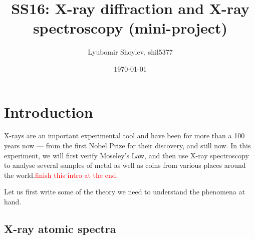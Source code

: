 \documentclass[11pt,a4paper,twoside,onecolumn]{article}
\title{\textbf{SS16: X-ray diffraction and X-ray spectroscopy (mini-project)}}
\author{Lyubomir Shoylev, shil5377}
\date{\today}
\newcommand{\reminder}[1]{\textcolor{red}{#1}}
\begin{document}
\maketitle

\begin{abstract}
    \lipsum
\end{abstract}

\section{Introduction}

X-rays are an important experimental tool and have been for more than a 100 years now --- from the first Nobel Prize for their discovery, and still now. In this experiment, we will first verify Moseley's Law, and then use X-ray spectroscopy to analyse several samples of metal as well as coins from various places around the world.\reminder{finish this intro at the end.} %

Let us first write some of the theory we need to understand the phenomena at hand.


\subsection{X-ray atomic spectra}
\end{document}
